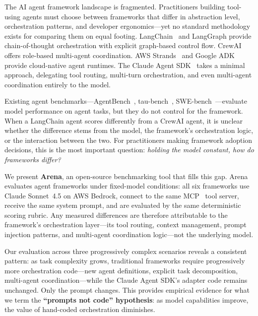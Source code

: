 \documentclass[sigconf]{acmart}
\begin{document}
The AI agent framework landscape is fragmented. Practitioners building tool-using agents must choose between frameworks that differ in abstraction level, orchestration patterns, and developer ergonomics---yet no standard methodology exists for comparing them on equal footing. LangChain~\cite{langchain} and LangGraph provide chain-of-thought orchestration with explicit graph-based control flow. CrewAI~\cite{crewai} offers role-based multi-agent coordination. AWS Strands~\cite{strands} and Google ADK~\cite{adk} provide cloud-native agent runtimes. The Claude Agent SDK~\cite{claudesdk} takes a minimal approach, delegating tool routing, multi-turn orchestration, and even multi-agent coordination entirely to the model.

Existing agent benchmarks---AgentBench~\cite{agentbench}, tau-bench~\cite{taubench}, SWE-bench~\cite{swebench}---evaluate model performance on agent tasks, but they do not control for the framework. When a LangChain agent scores differently from a CrewAI agent, it is unclear whether the difference stems from the model, the framework's orchestration logic, or the interaction between the two. For practitioners making framework adoption decisions, this is the most important question: \emph{holding the model constant, how do frameworks differ?}

We present \textbf{Arena}, an open-source benchmarking tool that fills this gap. Arena evaluates agent frameworks under fixed-model conditions: all six frameworks use Claude Sonnet~4.5 on AWS Bedrock, connect to the same MCP~\cite{mcp} tool server, receive the same system prompt, and are evaluated by the same deterministic scoring rubric. Any measured differences are therefore attributable to the framework's orchestration layer---its tool routing, context management, prompt injection patterns, and multi-agent coordination logic---not the underlying model.

Our evaluation across three progressively complex scenarios reveals a consistent pattern: as task complexity grows, traditional frameworks require progressively more orchestration code---new agent definitions, explicit task decomposition, multi-agent coordination---while the Claude Agent SDK's adapter code remains unchanged. Only the prompt changes. This provides empirical evidence for what we term the \textbf{``prompts not code'' hypothesis}: as model capabilities improve, the value of hand-coded orchestration diminishes.
\end{document}
